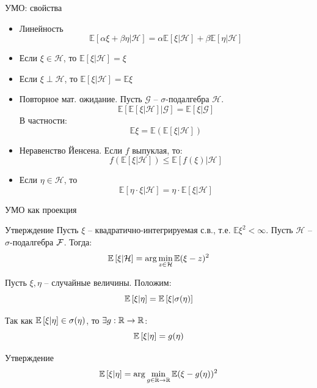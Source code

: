 \documentclass{beamer}
\begin{document}
\begin{frame}{УМО: свойства}
    \begin{itemize}
        \item Линейность
        $$
            \mathbb{E}\left[ \alpha \xi + \beta \eta | \mathcal{H} \right]
            = \alpha \mathbb{E}\left[ \xi  | \mathcal{H} \right] + \beta \mathbb{E} \left[ \eta  | \mathcal{H} \right]
        $$

        \item Если $\xi \in \mathcal{H}$, то $\mathbb{E}\left[ \xi | \mathcal{H} \right] = \xi$

        \item Если $\xi \perp \mathcal{H}$, то $\mathbb{E}\left[ \xi | \mathcal{H} \right] = \mathbb{E} \xi$
        
        \item Повторное мат. ожидание. Пусть $\mathcal{G}$ -- $\sigma$-подалгебра $\mathcal{H}$. 
        $$
            \mathbb{E} \left[ \mathbb{E}\left[ \xi | \mathcal{H} \right] | \mathcal{G} \right] = \mathbb{E}\left[ \xi | \mathcal{G} \right]
        $$
        В частности:
        $$
            \mathbb{E} \xi = \mathbb{E} (\mathbb{E}\left[ \xi | \mathcal{H} \right]) 
        $$

        \item Неравенство Йенсена. Если $f$ выпуклая, то:
        $$
            f(\mathbb{E}\left[ \xi | \mathcal{H} \right]) \leq \mathbb{E}\left[ f(\xi) | \mathcal{H} \right]
        $$

        \item Если $\eta \in \mathcal{H}$, то
        $$
            \mathbb{E} \left[ \eta\cdot\xi | \mathcal{H} \right] = \eta \cdot \mathbb{E}\left[ \xi | \mathcal{H} \right] 
        $$
    \end{itemize}
\end{frame}

\begin{frame}{УМО как проекция}
    \begin{block}{Утверждение}
        Пусть $\xi$ -- квадратично-интегрируемая с.в., т.е. $\mathbb{E} \xi^2 < \infty$. Пусть $\mathcal{H}$ -- $\sigma$-подалгебра $\mathcal{F}$. Тогда:
        $$
            \mathbb{E}\left[ \xi | \mathcal{H} \right] = \arg \min_{z \in \mathcal{H}} \mathbb{E} (\xi-z)^2
        $$
    \end{block}
    \pause

    Пусть $\xi, \eta$ -- случайные величины. Положим:
    $$
        \mathbb{E}\left[\xi | \eta\right] = \mathbb{E}\left[ \xi | \sigma(\eta) \right]
    $$

    Так как $\mathbb{E}\left[\xi | \eta\right] \in \sigma(\eta)$, то $\exists g:\mathbb{R}\to\mathbb{R}$: 
    $$
        \mathbb{E}\left[\xi | \eta\right] = g(\eta)
    $$
    \pause
    \begin{block}{Утверждение}
    $$
        \mathbb{E}\left[ \xi | \eta \right] = \arg \min_{g \in \mathbb{R} \to \mathbb{R}} \mathbb{E} (\xi-g(\eta))^2
    $$
    \end{block}
\end{frame}
\end{document}
